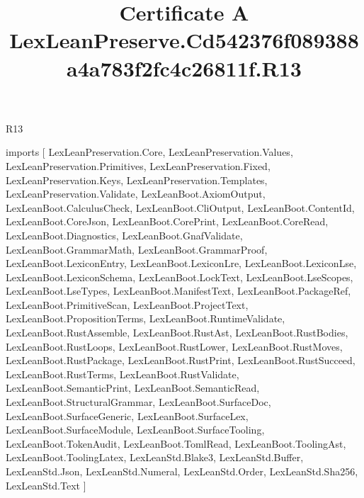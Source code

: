 \begin{lexlean}{R13}
\title{Certificate A LexLeanPreserve.Cd542376f089388a4a783f2fc4c26811f.R13}
\begin{coremodule}
imports [
  LexLeanPreservation.Core,
  LexLeanPreservation.Values,
  LexLeanPreservation.Primitives,
  LexLeanPreservation.Fixed,
  LexLeanPreservation.Keys,
  LexLeanPreservation.Templates,
  LexLeanPreservation.Validate,
  LexLeanBoot.AxiomOutput,
  LexLeanBoot.CalculusCheck,
  LexLeanBoot.CliOutput,
  LexLeanBoot.ContentId,
  LexLeanBoot.CoreJson,
  LexLeanBoot.CorePrint,
  LexLeanBoot.CoreRead,
  LexLeanBoot.Diagnostics,
  LexLeanBoot.GnafValidate,
  LexLeanBoot.GrammarMath,
  LexLeanBoot.GrammarProof,
  LexLeanBoot.LexiconEntry,
  LexLeanBoot.LexiconLre,
  LexLeanBoot.LexiconLse,
  LexLeanBoot.LexiconSchema,
  LexLeanBoot.LockText,
  LexLeanBoot.LseScopes,
  LexLeanBoot.LseTypes,
  LexLeanBoot.ManifestText,
  LexLeanBoot.PackageRef,
  LexLeanBoot.PrimitiveScan,
  LexLeanBoot.ProjectText,
  LexLeanBoot.PropositionTerms,
  LexLeanBoot.RuntimeValidate,
  LexLeanBoot.RustAssemble,
  LexLeanBoot.RustAst,
  LexLeanBoot.RustBodies,
  LexLeanBoot.RustLoops,
  LexLeanBoot.RustLower,
  LexLeanBoot.RustMoves,
  LexLeanBoot.RustPackage,
  LexLeanBoot.RustPrint,
  LexLeanBoot.RustSucceed,
  LexLeanBoot.RustTerms,
  LexLeanBoot.RustValidate,
  LexLeanBoot.SemanticPrint,
  LexLeanBoot.SemanticRead,
  LexLeanBoot.StructuralGrammar,
  LexLeanBoot.SurfaceDoc,
  LexLeanBoot.SurfaceGeneric,
  LexLeanBoot.SurfaceLex,
  LexLeanBoot.SurfaceModule,
  LexLeanBoot.SurfaceTooling,
  LexLeanBoot.TokenAudit,
  LexLeanBoot.TomlRead,
  LexLeanBoot.ToolingAst,
  LexLeanBoot.ToolingLatex,
  LexLeanStd.Blake3,
  LexLeanStd.Buffer,
  LexLeanStd.Json,
  LexLeanStd.Numeral,
  LexLeanStd.Order,
  LexLeanStd.Sha256,
  LexLeanStd.Text
]


\end{coremodule}
\end{lexlean}
